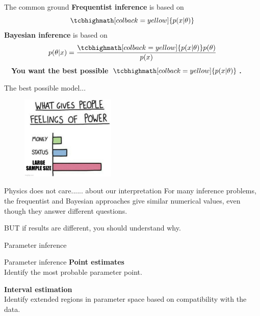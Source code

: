 \documentclass[
aspectratio=169,
14pt,
professionalfonts
]{beamer}
\newcommand{\arrow}{~\ding{220}~}
\begin{document}
\begin{frame}{The common ground}
    \textbf{Frequentist inference} is based on 
    $$\tcbhighmath[colback=yellow]{p(x|\theta)}$$
    \textbf{Bayesian inference} is based on
    $$p(\theta | x) = \frac{\tcbhighmath[colback=yellow]{p(x|\theta)} p(\theta)}{p(x)}$$
    \arrow \textbf{You want the best possible $\tcbhighmath[colback=yellow]{p(x|\theta)}$.}
\end{frame}

\begin{frame}[noframenumbering]{The best possible model...}
    \begin{figure}
        \includegraphics[width=0.4\textwidth]{../plots/sample_size.jpg}
    \end{figure}
\end{frame}

\begin{frame}{Physics does not care...}{... about our interpretation}
For many inference problems, the frequentist and Bayesian approaches give similar numerical values, even though they answer different questions.

\vspace{0.5cm}

BUT if results are different, you should understand why.
\end{frame}

\begin{frame}
\center
\Large
Parameter inference
\end{frame}

\begin{frame}{Parameter inference}
    \center
    \textbf{Point estimates}\\
    Identify the most probable parameter point.

    \vspace{1cm}

    \textbf{Interval estimation}\\
    Identify extended regions in parameter space based on compatibility with the data.
\end{frame}
\end{document}
